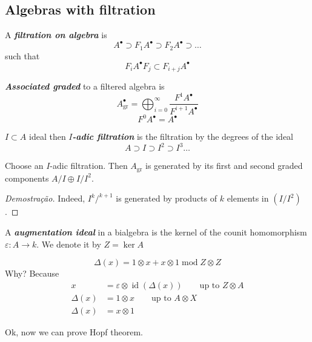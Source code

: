 \subsection{Algebras with filtration}

\begin{defn}
	A \textit{\textbf{filtration on algebra}} is
	\[A^\bullet  \supset  F_1A^\bullet\supset F_2A^\bullet\supset\ldots\]
	such that
	 \[F_i A^\bullet F_j\subset F_{i+j}A^\bullet\]
\end{defn}

\begin{defn}
	\textit{\textbf{Associated graded}} to a filtered algebra is
\[A^\bullet_{\operatorname{gr}}=\bigoplus_{i=0}^\infty \dfrac{F^1A^\bullet}{F^{i+1}A^\bullet} \]
\[F^0A^\bullet=A^\bullet\]
\end{defn}

\begin{defn}
	$I\subset A$ ideal then \textit{\textbf{$I$-adic filtration}} is the filtration by the degrees of the ideal
	\[A\supset I\supset  I^2 \supset  I^3\ldots\]
\end{defn}

\begin{lemma}
	Choose an $I$-adic filtration. Then $A_{\operatorname{gr}}$ is generated by its first and second graded components $A/I\oplus I/I^2$.
\end{lemma}

\begin{proof}[Demostra\c c\~ao]
	Indeed, $I^k/^{k+1}$ is generated by products of $k$ elements in $(I/I^2)$.
\end{proof}

\begin{defn}
	A \textit{\textbf{augmentation ideal}} in a bialgebra is the kernel of the counit homomorphism $\varepsilon:A\to k$. We denote it by $Z=\ker A$
\end{defn}

\begin{remark}
\[\Delta(x)=1\otimes x+x\otimes 1 \operatorname{mod}Z\otimes Z\]
Why? Because
\begin{align*}
	x&=\varepsilon \otimes \operatorname{id}(\Delta(x))\qquad \text{up to $Z\otimes A$}\\
	\Delta(x)& =1\otimes x\qquad \text{up to $A\otimes X$} \\
	\Delta(x)&=x\otimes 1
\end{align*}
\end{remark}

Ok, now we can prove Hopf theorem.

